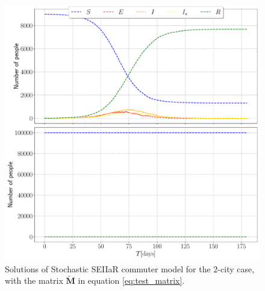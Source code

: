 \begin{figure}[htb]
	\centering
	\includegraphics[width=0.8\columnwidth]{../fig/test_commuter.pdf}
	\caption{Solutions of Stochastic SEIIaR commuter model for the $2$-city case, with the matrix $\mathbf{\widetilde{M}}$ in equation \eqref{eq:test_matrix}.}
	\label{fig:test_commuter}
\end{figure}

\clearpage